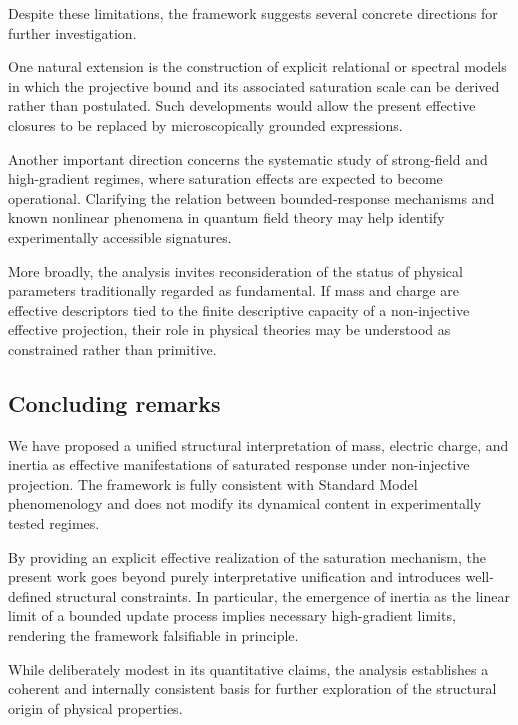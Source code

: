 \documentclass[pdflatex,sn-mathphys-num]{sn-jnl} %
\theoremstyle{remark}
\begin{document}
    Despite these limitations, the framework suggests several concrete directions for
    further investigation.

    One natural extension is the construction of explicit relational or spectral
    models in which the projective bound and its associated saturation scale can be
    derived rather than postulated.
    Such developments would allow the present effective closures to be replaced by
    microscopically grounded expressions.

    Another important direction concerns the systematic study of strong-field and
    high-gradient regimes, where saturation effects are expected to become
    operational.
    Clarifying the relation between bounded-response mechanisms and known nonlinear
    phenomena in quantum field theory may help identify experimentally accessible
    signatures.

    More broadly, the analysis invites reconsideration of the status of physical
    parameters traditionally regarded as fundamental.
    If mass and charge are effective descriptors tied to the finite descriptive
    capacity of a non-injective effective projection,
    their role in physical theories may be understood as constrained rather than
    primitive.

  \subsection{Concluding remarks}
    \label{subsec:conclusion}

    We have proposed a unified structural interpretation of mass, electric charge, and
    inertia as effective manifestations of saturated response under non-injective
    projection.
    The framework is fully consistent with Standard Model phenomenology and does not
    modify its dynamical content in experimentally tested regimes.

    By providing an explicit effective realization of the saturation mechanism, the
    present work goes beyond purely interpretative unification and introduces
    well-defined structural constraints.
    In particular, the emergence of inertia as the linear limit of a bounded update
    process implies necessary high-gradient limits, rendering the framework
    falsifiable in principle.

    While deliberately modest in its quantitative claims, the analysis establishes a
    coherent and internally consistent basis for further exploration of the
    structural origin of physical properties.
\end{document}
